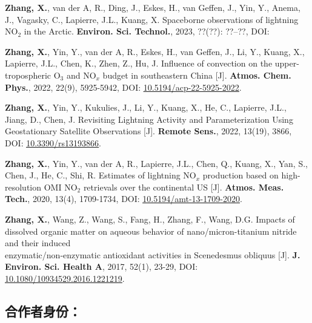 \begin{enumerate}[label={[\arabic*]}, leftmargin=20pt, widest=0, itemindent=*, topsep=0pt, partopsep=0pt, parsep=0pt]

\item \textbf{Zhang, X.}, van der A, R., Ding, J., Eskes, H., van Geffen, J., Yin, Y., Anema, J.,
Vagasky, C., Lapierre, J.L., Kuang, X. Spaceborne observations of lightning
NO$_2$ in the Arctic. \textbf{Environ. Sci. Technol.}, 2023, ??(??): ??--??,
DOI:

\item \textbf{Zhang, X.}, Yin, Y., van der A, R., Eskes, H., van Geffen, J., Li, Y., Kuang, X., Lapierre,
J.L., Chen, K., Zhen, Z., Hu, J. Influence of convection on the
upper-tropospheric O$_3$ and NO$_x$ budget in southeastern China [J].
\textbf{Atmos. Chem. Phys.}, 2022, 22(9), 5925-5942,
DOI: \underline{\href{https://doi.org/10.5194/acp-22-5925-2022}{10.5194/acp-22-5925-2022}}.

\item \textbf{Zhang, X.}, Yin, Y., Kukulies, J., Li, Y., Kuang, X., He, C., Lapierre, J.L., Jiang, D., Chen,
J. Revisiting Lightning Activity and Parameterization Using Geostationary
Satellite Observations [J].
\textbf{Remote Sens.}, 2022, 13(19), 3866,
DOI: \underline{\href{https://doi.org/10.3390/rs13193866}{10.3390/rs13193866}}.

\item \textbf{Zhang, X.}, Yin, Y., van der A, R., Lapierre, J.L., Chen, Q., Kuang, X., Yan, S., Chen, J.,
He, C., Shi, R. Estimates of lightning NO$_x$ production based on high-resolution
OMI NO$_2$ retrievals over the continental US [J].
\textbf{Atmos. Meas. Tech.}, 2020, 13(4), 1709-1734,
DOI: \underline{\href{https://doi.org/10.5194/amt-13-1709-2020}{10.5194/amt-13-1709-2020}}.

\item \textbf{Zhang, X.}, Wang, Z., Wang, S., Fang, H., Zhang, F., Wang, D.G.
Impacts of dissolved organic matter on aqueous behavior of nano/micron-titanium nitride and their induced \\
enzymatic/non-enzymatic antioxidant activities in Scenedesmus obliquus [J].
\textbf{J. Environ. Sci. Health A}, 2017, 52(1), 23-29,
DOI: \underline{\href{https://doi.org/10.1080/10934529.2016.1221219}{10.1080/10934529.2016.1221219}}.

\end{enumerate}

\subsection*{合作者身份：}

